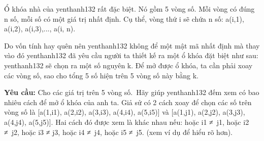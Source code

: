 Ổ khóa nhà của yenthanh132 rất đặc biệt. Nó gồm 5 vòng số. Mỗi vòng có đúng n số, mỗi số có một giá trị nhất định. Cụ thể, vòng thứ i sẽ chứa n số: a(i,1), a(i,2), a(i,3),..., a(i, n).

Do vốn tính hay quên nên yenthanh132 không để một mật mã nhất định mà thay vào đó yenthanh132 đã yêu cầu người ta thiết kế ra một ổ khóa đặt biệt như sau: yenthanh132 sẽ chọn ra một số nguyên k. Để mở được ổ khóa, ta cần phải xoay các vòng số, sao cho tổng 5 số hiện trên 5 vòng số này bằng k.

\textbf{Yêu cầu: } Cho các giá trị trên 5 vòng số. Hãy giúp yenthanh132 đếm xem có bao nhiêu cách để mở ổ khóa của anh ta. Giả sử có 2 cách xoay để chọn các số trên vòng số là [a(1,i1), a(2,i2), a(3,i3), a(4,i4), a(5,i5)] và [a(1,j1), a(2,j2), a(3,j3), a(4,j4), a(5,j5)]. Hai cách đó được xem là khác nhau nếu: hoặc i1 ≠ j1, hoặc i2 ≠ j2, hoặc i3 ≠ j3, hoặc i4 ≠ j4, hoặc i5 ≠ j5. (xem ví dụ để hiểu rõ hơn).